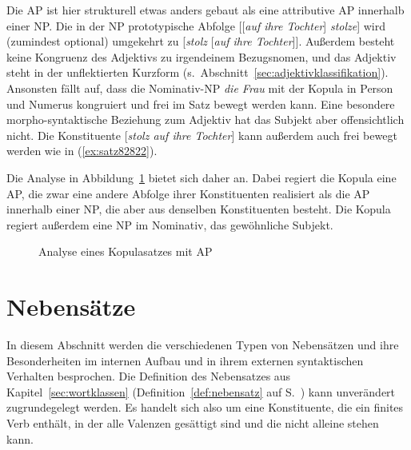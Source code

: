 Die AP ist hier strukturell etwas anders gebaut als eine attributive AP innerhalb einer NP.
Die in der NP prototypische Abfolge [[\textit{auf ihre Tochter}] \textit{stolze}] wird (zumindest optional) umgekehrt zu [\textit{stolz} [\textit{auf ihre Tochter}]].
Außerdem besteht keine Kongruenz des Adjektivs zu irgendeinem Bezugsnomen, und das Adjektiv steht in der unflektierten Kurzform (s.\ Abschnitt~\ref{sec:adjektivklassifikation}).
Ansonsten fällt auf, dass die Nominativ-NP \textit{die Frau} mit der Kopula in Person und Numerus kongruiert und frei im Satz bewegt werden kann.
Eine besondere morpho-syntaktische Beziehung zum Adjektiv hat das Subjekt aber offensichtlich nicht.
Die Konstituente [\textit{stolz auf ihre Tochter}] kann außerdem auch frei bewegt werden wie in (\ref{ex:satz82822}).

\begin{exe}
\end{exe}

Die Analyse in Abbildung~\ref{fig:kopulav22} bietet sich daher an.
Dabei regiert die Kopula eine AP, die zwar eine andere Abfolge ihrer Konstituenten realisiert als die AP innerhalb einer NP, die aber aus denselben Konstituenten besteht.
Die Kopula regiert außerdem eine NP im Nominativ, das gewöhnliche Subjekt.

\begin{figure}
  \caption{Analyse eines Kopulasatzes mit AP}
  \label{fig:kopulav22}
\end{figure}

\section{Nebensätze}

\label{sec:nebensaetze}

In diesem Abschnitt werden die verschiedenen Typen von Nebensätzen und ihre Besonderheiten im internen Aufbau und in ihrem externen syntaktischen Verhalten besprochen.
Die Definition des Nebensatzes aus Kapitel~\ref{sec:wortklassen} (Definition~\ref{def:nebensatz} auf S.~\pageref{def:nebensatz}) kann unverändert zugrundegelegt werden.
Es handelt sich also um eine Konstituente, die ein finites Verb enthält, in der alle Valenzen gesättigt sind und die nicht alleine stehen kann.

